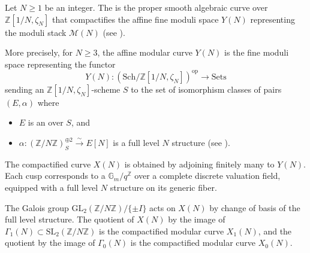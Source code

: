 \begin{definition} \label{definition:X_N_compactified_modular_curve_parameterizing_level_N_structures_on_generalized_elliptic_curves}
Let $N \geq 1$ be an integer. The  is the proper smooth algebraic curve over $\mathbb{Z}[1/N, \zeta_N]$ that compactifies the affine fine moduli space $Y(N)$ representing the moduli stack $\mathcal{M}(N)$ (see ).

More precisely, for $N \geq 3$, the affine modular curve $Y(N)$ is the fine moduli space representing the functor
\[
    Y(N): (\mathrm{Sch}/\mathbb{Z}[1/N, \zeta_N])^{\mathrm{op}} \longrightarrow \mathrm{Sets}
\]
sending an $\mathbb{Z}[1/N, \zeta_N]$-scheme $S$ to the set of isomorphism classes of pairs $(E, \alpha)$ where
\begin{itemize}
    \item $E$ is an  over $S$, and
    \item $\alpha: (\mathbb{Z}/N\mathbb{Z})_S^{\oplus 2} \xrightarrow{\sim} E[N]$ is a full level $N$ structure (see ).
\end{itemize}

The compactified curve $X(N)$ is obtained by adjoining finitely many  to $Y(N)$. Each cusp corresponds to a  $\mathbb{G}_m/q^{\mathbb{Z}}$ over a complete discrete valuation field, equipped with a full level $N$ structure on its generic fiber.

The Galois group $\mathrm{GL}_2(\mathbb{Z}/N\mathbb{Z}) / \{\pm I\}$ acts on $X(N)$ by change of basis of the full level structure. The quotient of $X(N)$ by the image of $\Gamma_1(N) \subset \mathrm{SL}_2(\mathbb{Z}/N\mathbb{Z})$ is the compactified modular curve $X_1(N)$, and the quotient by the image of $\Gamma_0(N)$ is the compactified modular curve $X_0(N)$.
\end{definition}
